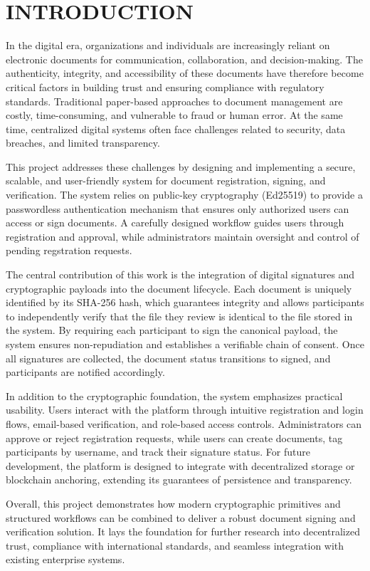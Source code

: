 \chapter*{INTRODUCTION}

In the digital era, organizations and individuals are increasingly reliant on electronic documents for communication, collaboration, and decision-making. The authenticity, integrity, and accessibility of these documents have therefore become critical factors in building trust and ensuring compliance with regulatory standards. Traditional paper-based approaches to document management are costly, time-consuming, and vulnerable to fraud or human error. At the same time, centralized digital systems often face challenges related to security, data breaches, and limited transparency.

This project addresses these challenges by designing and implementing a secure, scalable, and user-friendly system for document registration, signing, and verification. The system relies on public-key cryptography (Ed25519) to provide a passwordless authentication mechanism that ensures only authorized users can access or sign documents. A carefully designed workflow guides users through registration and approval, while administrators maintain oversight and control of pending regstration requests.

The central contribution of this work is the integration of digital signatures and cryptographic payloads into the document lifecycle. Each document is uniquely identified by its SHA-256 hash, which guarantees integrity and allows participants to independently verify that the file they review is identical to the file stored in the system. By requiring each participant to sign the canonical payload, the system ensures non-repudiation and establishes a verifiable chain of consent. Once all signatures are collected, the document status transitions to signed, and participants are notified accordingly.

In addition to the cryptographic foundation, the system emphasizes practical usability. Users interact with the platform through intuitive registration and login flows, email-based verification, and role-based access controls. Administrators can approve or reject registration requests, while users can create documents, tag participants by username, and track their signature status. For future development, the platform is designed to integrate with decentralized storage or blockchain anchoring, extending its guarantees of persistence and transparency.

Overall, this project demonstrates how modern cryptographic primitives and structured workflows can be combined to deliver a robust document signing and verification solution. It lays the foundation for further research into decentralized trust, compliance with international standards, and seamless integration with existing enterprise systems.
